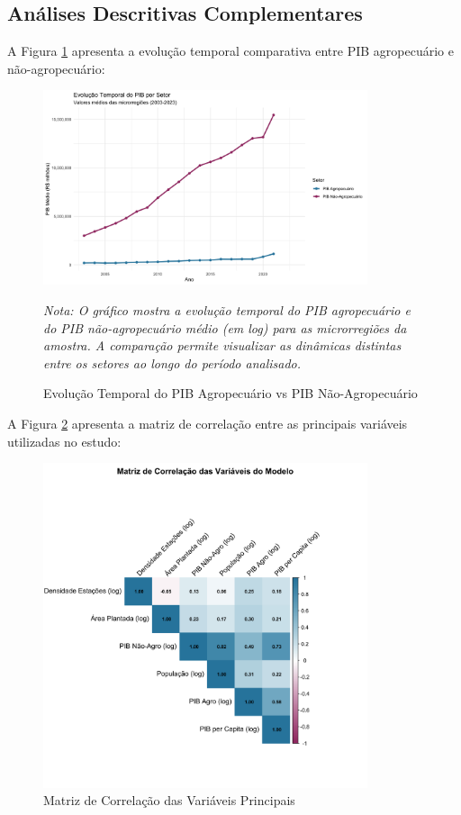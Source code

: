 \documentclass[
	12pt,				%
	oneside,			%
	a4paper,			%
	english,			%
	french,				%
	spanish,			%
	brazil				%
	]{abntex2}
\begin{document}
\begin{apendicesenv}
\section{Análises Descritivas Complementares}

A Figura \ref{fig:evolucao_pib} apresenta a evolução temporal comparativa entre PIB agropecuário e não-agropecuário:

\begin{figure}[h]
\centering
\caption{Evolução Temporal do PIB Agropecuário vs PIB Não-Agropecuário}
\label{fig:evolucao_pib}
\includegraphics[width=0.85\textwidth]{../../../data/outputs/descriptive_analysis/evolucao_temporal_pib.png}

\textit{Nota: O gráfico mostra a evolução temporal do PIB agropecuário e do PIB não-agropecuário médio (em log) para as microrregiões da amostra. A comparação permite visualizar as dinâmicas distintas entre os setores ao longo do período analisado.}
\end{figure}

A Figura \ref{fig:correlacao} apresenta a matriz de correlação entre as principais variáveis utilizadas no estudo:

\begin{figure}[h]
\centering
\caption{Matriz de Correlação das Variáveis Principais}
\label{fig:correlacao}
\includegraphics[width=0.85\textwidth]{../../../data/outputs/descriptive_analysis/matriz_correlacao.png}


\end{figure}
\end{apendicesenv}
\end{document}
